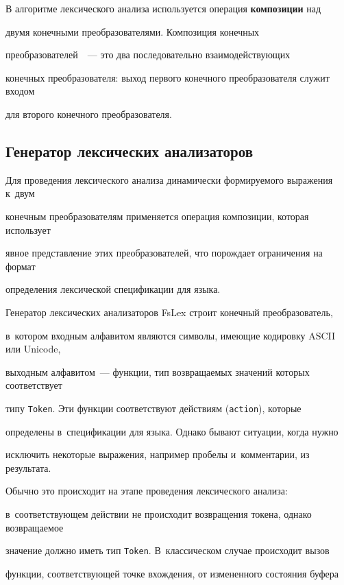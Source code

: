 В алгоритме лексического анализа используется операция \textbf{композиции} над 


двумя конечными преобразователями. Композиция конечных 


преобразователей~\cite{FST}~--- это два последовательно взаимодействующих 


конечных преобразователя: выход первого конечного преобразователя служит входом 


для второго конечного преобразователя.





\subsection{Генератор лексических анализаторов}





Для проведения лексического анализа динамически формируемого выражения к~двум 


конечным преобразователям применяется операция композиции, которая использует 


явное представление этих преобразователей, что порождает ограничения на формат 


определения лексической спецификации для языка.





Генератор лексических анализаторов FsLex строит конечный преобразователь, 


в~котором входным алфавитом являются символы, имеющие кодировку ASCII или Unicode, 


выходным алфавитом~--- функции, тип возвращаемых значений которых соответствует 


типу \verb"Token". Эти функции соответствуют действиям (\verb"action"), которые 


определены в~спецификации для языка.  Однако бывают ситуации, когда нужно 


исключить некоторые выражения, например пробелы и~комментарии, из результата. 


Обычно это происходит на этапе проведения лексического анализа: 


в~соответствующем действии не происходит возвращения токена, однако возвращаемое 


значение должно иметь тип \verb"Token".  В~классическом случае происходит вызов 


функции, соответствующей точке вхождения, от измененного состояния буфера 


